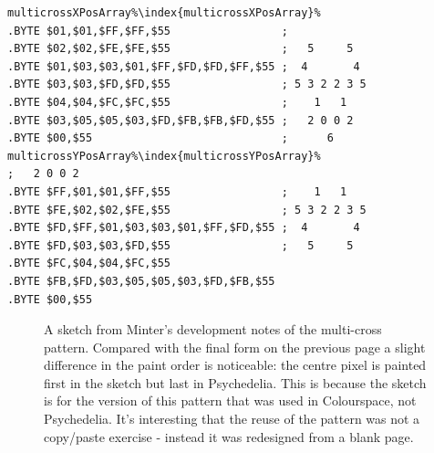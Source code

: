 \begin{minipage}[b]{0.48\linewidth}
\begin{lrbox}{\mybox}%
\begin{lstlisting}[basicstyle=\ttfamily\tiny,escapechar=\%]
multicrossXPosArray%\index{multicrossXPosArray}% 
.BYTE $01,$01,$FF,$FF,$55                 ;
.BYTE $02,$02,$FE,$FE,$55                 ;   5     5  
.BYTE $01,$03,$03,$01,$FF,$FD,$FD,$FF,$55 ;  4       4 
.BYTE $03,$03,$FD,$FD,$55                 ; 5 3 2 2 3 5
.BYTE $04,$04,$FC,$FC,$55                 ;    1   1   
.BYTE $03,$05,$05,$03,$FD,$FB,$FB,$FD,$55 ;   2 0 0 2  
.BYTE $00,$55                             ;      6     
multicrossYPosArray%\index{multicrossYPosArray}%                       ;   2 0 0 2  
.BYTE $FF,$01,$01,$FF,$55                 ;    1   1   
.BYTE $FE,$02,$02,$FE,$55                 ; 5 3 2 2 3 5
.BYTE $FD,$FF,$01,$03,$03,$01,$FF,$FD,$55 ;  4       4 
.BYTE $FD,$03,$03,$FD,$55                 ;   5     5  
.BYTE $FC,$04,$04,$FC,$55                 
.BYTE $FB,$FD,$03,$05,$05,$03,$FD,$FB,$55 
.BYTE $00,$55
\end{lstlisting}
\end{lrbox}%
\scalebox{0.8}{\usebox{\mybox}}

\end{minipage}
\clearpage
\begin{figure}[H]
    \centering
    \begin{adjustbox}{width=7cm,center}
    \end{adjustbox}
\caption{
  A sketch from Minter's development notes of the multi-cross pattern. Compared with the final form on the previous page
  a slight difference in the paint order is noticeable: the centre pixel is painted first in the sketch but last in Psychedelia.
  This is because the sketch is for the version of this pattern that was used in Colourspace, not Psychedelia. It's interesting
  that the reuse of the pattern was not a copy/paste exercise - instead it was redesigned from a blank page.
  }
\end{figure}
